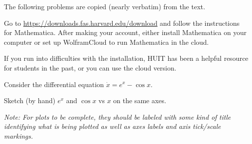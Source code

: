 \documentclass[12pt,letterpaper,noanswers]{exam}
\begin{document}
\noindent The following problems are copied (nearly verbatim) from the text.
\begin{questions}





\setcounter{question}{-1}
\question Go to \url{https://downloads.fas.harvard.edu/download} and follow the instructions for Mathematica.  After making your account, either install Mathematica on your computer or set up WolframCloud to run Mathematica in the cloud.

If you run into difficulties with the installation, HUIT has been a helpful resource for students in the past, or you can use the cloud version.


\question Consider the differential equation $\dot{x} = e^x - \cos x$.  
\begin{parts}
\item Sketch (by hand) $e^x$ and $\cos x$ vs $x$ on the same axes.  

\emph{Note: For plots to be complete, they should be labeled with some kind of title identifying what is being plotted as well as axes labels and axis tick/scale markings.}



\end{parts}
\end{questions}
\end{document}
